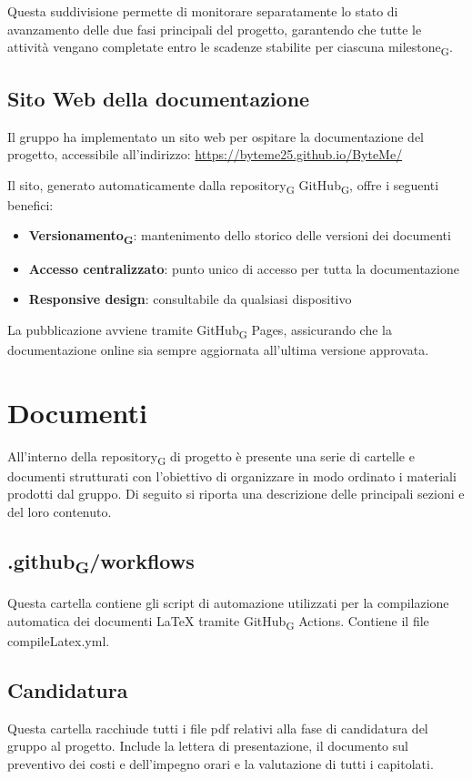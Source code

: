 \documentclass[11pt,a4paper]{article}
\newcommand{\gls}[1]{#1\textsubscript{G}}
\begin{document}
Questa suddivisione permette di monitorare separatamente lo stato di avanzamento delle due fasi principali del progetto, garantendo che tutte le attività vengano completate entro le scadenze stabilite per ciascuna \gls{milestone}.


\subsection{Sito Web della documentazione}
Il gruppo ha implementato un sito web per ospitare la documentazione del progetto, accessibile all'indirizzo: \url{https://byteme25.github.io/ByteMe/}

Il sito, generato automaticamente dalla \gls{repository} \gls{GitHub}, offre i seguenti benefici:
\begin{itemize}
    \item \textbf{\gls{Versionamento}}: mantenimento dello storico delle versioni dei documenti
    \item \textbf{Accesso centralizzato}: punto unico di accesso per tutta la documentazione
    \item \textbf{Responsive design}: consultabile da qualsiasi dispositivo
\end{itemize}

La pubblicazione avviene tramite \gls{GitHub} Pages, assicurando che la documentazione online sia sempre aggiornata all'ultima versione approvata.

\newpage

\section{Documenti}
All’interno della \gls{repository} di progetto è presente una serie di cartelle e documenti strutturati con l’obiettivo di organizzare in modo ordinato i materiali prodotti dal gruppo. Di seguito si riporta una descrizione delle principali sezioni e del loro contenuto.

\subsection{.\gls{github}/workflows}
Questa cartella contiene gli script di automazione utilizzati per la compilazione automatica dei documenti LaTeX tramite \gls{GitHub} Actions. Contiene il file compileLatex.yml.

\subsection{Candidatura}
Questa cartella racchiude tutti i file pdf relativi alla fase di candidatura del gruppo al progetto. Include la lettera di presentazione, il documento sul preventivo dei costi e dell'impegno orari e la valutazione di tutti i capitolati.
\end{document}
